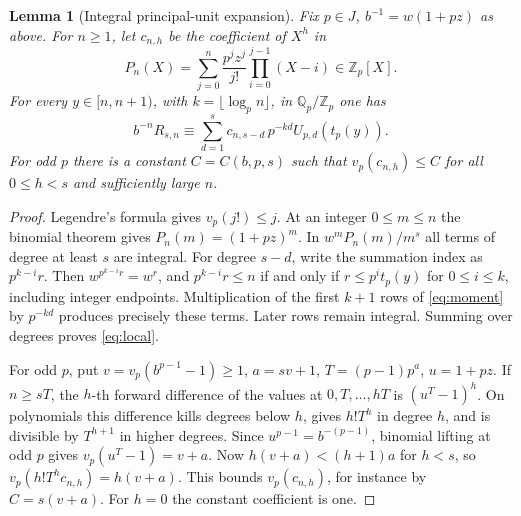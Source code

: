 \documentclass[11pt]{article}
\newtheorem{lemma}[theorem]{Lemma}
\newcommand{\Z}{\mathbb Z}
\newcommand{\Q}{\mathbb Q}
\begin{document}
\begin{lemma}[Integral principal-unit expansion]\label{lem:identity}
Fix \(p\in J\), \(b^{-1}=w(1+pz)\) as above. For \(n\ge1\), let \(c_{n,h}\) be the coefficient of \(X^h\) in
\[
 P_n(X)=\sum_{j=0}^{n}\frac{p^jz^j}{j!}\prod_{i=0}^{j-1}(X-i)\in\Z_p[X].
\]
For every \(y\in[n,n+1)\), with \(k=\lfloor\log_p n\rfloor\), in \(\Q_p/\Z_p\) one has
\begin{equation}\label{eq:local}
 b^{-n}R_{s,n}\equiv
 \sum_{d=1}^s c_{n,s-d}\,p^{-kd} U_{p,d}(t_p(y)).
\end{equation}
For odd \(p\) there is a constant \(C=C(b,p,s)\) such that \(v_p(c_{n,h})\le C\) for all \(0\le h<s\) and sufficiently large \(n\).
\end{lemma}
\begin{proof}
Legendre's formula gives \(v_p(j!)\le j\). At an integer \(0\le m\le n\) the binomial theorem gives \(P_n(m)=(1+pz)^m\). In \(w^mP_n(m)/m^s\) all terms of degree at least \(s\) are integral. For degree \(s-d\), write the summation index as \(p^{k-i}r\). Then \(w^{p^{k-i}r}=w^r\), and \(p^{k-i}r\le n\) if and only if \(r\le p^it_p(y)\) for \(0\le i\le k\), including integer endpoints. Multiplication of the first \(k+1\) rows of \eqref{eq:moment} by \(p^{-kd}\) produces precisely these terms. Later rows remain integral. Summing over degrees proves \eqref{eq:local}.

For odd \(p\), put \(v=v_p(b^{p-1}-1)\ge1\), \(a=sv+1\), \(T=(p-1)p^a\), \(u=1+pz\). If \(n\ge sT\), the \(h\)-th forward difference of the values at \(0,T,\ldots,hT\) is \((u^T-1)^h\). On polynomials this difference kills degrees below \(h\), gives \(h!T^h\) in degree \(h\), and is divisible by \(T^{h+1}\) in higher degrees. Since \(u^{p-1}=b^{-(p-1)}\), binomial lifting at odd \(p\) gives \(v_p(u^T-1)=v+a\). Now \(h(v+a)<(h+1)a\) for \(h<s\), so
\(
 v_p(h!T^h c_{n,h})=h(v+a).
\)
This bounds \(v_p(c_{n,h})\), for instance by \(C=s(v+a)\). For \(h=0\) the constant coefficient is one.
\end{proof}
\end{document}
